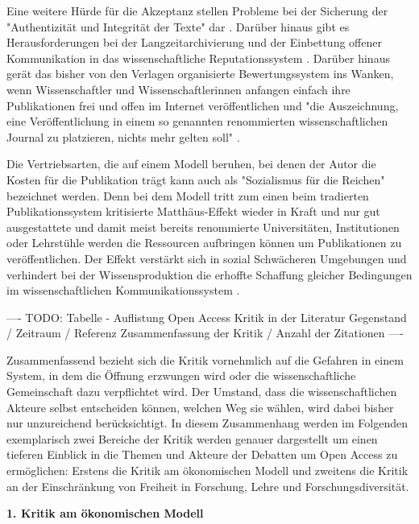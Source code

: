 Eine weitere Hürde für die Akzeptanz stellen Probleme bei der Sicherung der "Authentizität und Integrität der Texte" dar \cite{weishaupt_2009_goldenOA} \cite[:191]{Fehling_2014}. Darüber hinaus gibt es Herausforderungen bei der Langzeitarchivierung \cite{hagner_2015_sache_buches} \cite{Martin_2013} und der Einbettung offener Kommunikation in das wissenschaftliche Reputationssystem \cite{weishaupt_2009_goldenOA} \cite{Suber_2002} \cite{Adema_2014_open_access}. Darüber hinaus gerät das bisher von den Verlagen organisierte Bewertungssystem ins Wanken, wenn Wissenschaftler und Wissenschaftlerinnen anfangen einfach ihre Publikationen frei und offen im Internet veröffentlichen und "die Auszeichnung, eine Veröffentlichung in einem so genannten renommierten wissenschaftlichen Journal zu platzieren, nichts mehr gelten soll" \cite{Schirmbacher_oa_2007}.

Die Vertriebsarten, die auf einem Modell beruhen, bei denen der Autor die Kosten für die Publikation trägt kann auch als "Sozialismus für die Reichen" \cite{cope2014future} bezeichnet werden. Denn bei dem Modell tritt zum einen beim tradierten Publikationssystem kritisierte Matthäus-Effekt wieder in Kraft und nur gut ausgestattete und damit meist bereits renommierte Universitäten, Institutionen oder Lehrstühle werden die Ressourcen aufbringen können um Publikationen zu veröffentlichen. Der Effekt verstärkt sich in sozial Schwächeren Umgebungen und verhindert bei der Wissensproduktion die erhoffte Schaffung gleicher Bedingungen im wissenschaftlichen Kommunikationssystem \cite{suchen}.

---- TODO: Tabelle - Auflistung Open Access Kritik in der Literatur
Gegenstand / Zeitraum / Referenz Zusammenfassung der Kritik / Anzahl der Zitationen ----

Zusammenfassend bezieht sich die Kritik vornehmlich auf die Gefahren in einem System, in dem die Öffnung erzwungen wird oder die wissenschaftliche Gemeinschaft dazu verpflichtet wird. Der Umstand, dass die wissenschaftlichen Akteure selbst entscheiden können, welchen Weg sie wählen, wird dabei bisher nur unzureichend berücksichtigt. In diesem Zusammenhang werden im Folgenden exemplarisch zwei Bereiche der Kritik werden genauer dargestellt um einen tieferen Einblick in die Themen und Akteure der Debatten um Open Access zu ermöglichen: Erstens die Kritik am ökonomischen Modell und zweitens die Kritik an der Einschränkung von Freiheit in Forschung, Lehre und Forschungsdiversität.

\textbf{1. Kritik am ökonomischen Modell}

